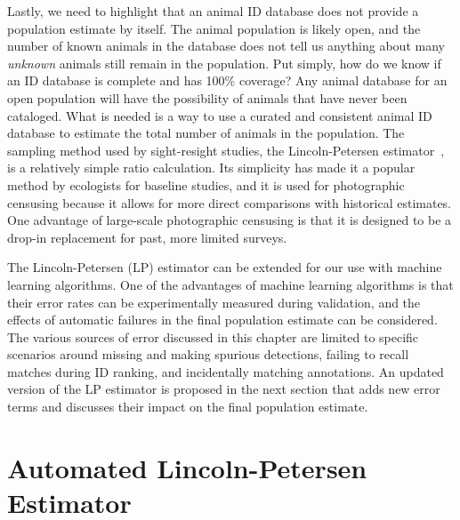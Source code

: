 Lastly, we need to highlight that an animal ID database does not provide a population estimate by itself.  The animal population is likely open, and the number of known animals in the database does not tell us anything about many \textit{unknown} animals still remain in the population.  Put simply, how do we know if an ID database is complete and has 100\% coverage?  Any animal database for an open population will have the possibility of animals that have never been cataloged.  What is needed is a way to use a curated and consistent animal ID database to estimate the total number of animals in the population.  The sampling method used by sight-resight studies, the Lincoln-Petersen estimator~\cite{petersen_valuation_1911}, is a relatively simple ratio calculation.  Its simplicity has made it a popular method by ecologists for baseline studies, and it is used for photographic censusing because it allows for more direct comparisons with historical estimates.  One advantage of large-scale photographic censusing is that it is designed to be a drop-in replacement for past, more limited surveys.

The Lincoln-Petersen (LP) estimator can be extended for our use with machine learning algorithms.  One of the advantages of machine learning algorithms is that their error rates can be experimentally measured during validation, and the effects of automatic failures in the final population estimate can be considered.  The various sources of error discussed in this chapter are limited to specific scenarios around missing and making spurious detections, failing to recall matches during ID ranking, and incidentally matching annotations.  An updated version of the LP estimator is proposed in the next section that adds new error terms and discusses their impact on the final population estimate.

\section{Automated Lincoln-Petersen Estimator} \label{sec:ca-math}

